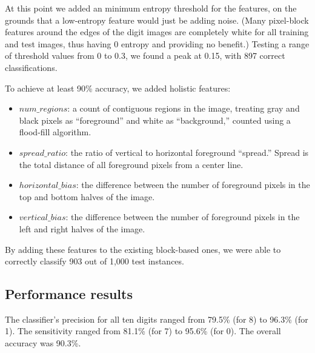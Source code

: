\documentclass[11pt]{article}
\begin{document}
At this point we added an minimum entropy threshold for the features, on the grounds
that a low-entropy feature would just be adding noise. (Many pixel-block features around
the edges of the digit images are completely white for all training and test images,
thus having 0 entropy and providing no benefit.) Testing a range of threshold values from
0 to 0.3, we found a peak at 0.15, with 897 correct classifications.

To achieve at least 90\% accuracy, we added holistic features:

\begin{itemize}[noitemsep]
\item $num\_regions$: a count of contiguous regions in the image, treating gray and black
pixels as ``foreground'' and white as ``background,'' counted using a flood-fill algorithm.
\item $spread\_ratio$: the ratio of vertical to horizontal foreground ``spread.'' Spread
is the total distance of all foreground pixels from a center line.
\item $horizontal\_bias$: the difference between the number of foreground pixels in the
top and bottom halves of the image.
\item $vertical\_bias$: the difference between the number of foreground pixels in the
left and right halves of the image.
\end{itemize}

By adding these features to the existing block-based ones, we were able to correctly
classify 903 out of 1,000 test instances.

\subsection{Performance results}

The classifier's precision for all ten digits ranged from 79.5\% (for 8) to 96.3\% (for 1).
The sensitivity ranged from 81.1\% (for 7) to 95.6\% (for 0). The overall accuracy was 90.3\%.
\end{document}
